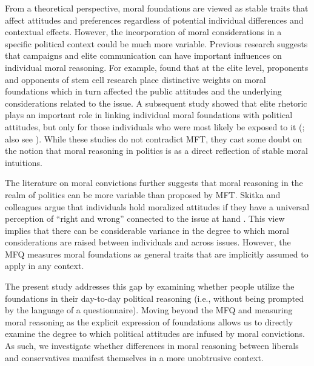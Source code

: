 \documentclass[12pt]{article}
\begin{document}
From a theoretical perspective, moral foundations are viewed as stable traits that affect attitudes and preferences regardless of potential individual differences and contextual effects. However, the incorporation of moral considerations in a specific political context could be much more variable. Previous research suggests that campaigns and elite communication can have important influences on individual moral reasoning. For example, \citet{clifford2013words} found that at the elite level, proponents and opponents of stem cell research place distinctive weights on moral foundations which in turn affected the public attitudes and the underlying considerations related to the issue. A subsequent study showed that elite rhetoric plays an important role in linking individual moral foundations with political attitudes, but only for those individuals who were most likely be exposed to it (\citealt{clifford2015concerns}; also see \citealt{day2014shifting}). While these studies do not contradict MFT, they cast some doubt on the notion that moral reasoning in politics is as a direct reflection of stable moral intuitions. 

The literature on moral convictions further suggests that moral reasoning in the realm of politics can be more variable than proposed by MFT. Skitka and colleagues argue that individuals hold moralized attitudes if they have a universal perception of ``right and wrong'' connected to the issue at hand \citep{skitka2005moral,mullen2006exploring,skitka2010psychology,ryan2014reconsidering,ryan2016no}. This view implies that there can be considerable variance in the degree to which moral considerations are raised between individuals and across issues. However, the MFQ measures moral foundations as general traits that are implicitly assumed to apply in any context. 

The present study addresses this gap by examining whether people utilize the foundations in their day-to-day political reasoning (i.e., without being prompted by the language of a questionnaire). Moving beyond the MFQ and measuring moral reasoning as the explicit expression of foundations allows us to directly examine the degree to which political attitudes are infused by moral convictions. As such, we investigate whether differences in moral reasoning between liberals and conservatives manifest themselves in a more unobtrusive context.
\end{document}
